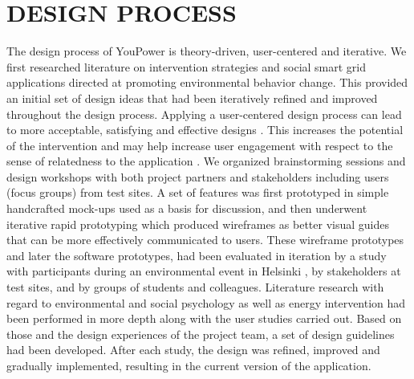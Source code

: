 

\section{\uppercase{Design Process}}

\noindent The design process of YouPower is theory-driven, user-centered and iterative. We first researched literature on intervention strategies and social smart grid applications directed at promoting environmental behavior change. This provided an initial set of design ideas that had been iteratively refined and improved throughout the design process. 
% 
Applying a user-centered design process can lead to more acceptable, satisfying and effective designs \cite{Brynjarsdottir2012}. This increases the potential of the intervention and may help increase user engagement with respect to the sense of relatedness to the application \cite{dick2012empowering,Pierce2012,schwartz2015people, edward2015review}. 
% 
We organized brainstorming sessions and design workshops with both project partners and stakeholders including users (focus groups) from test sites. A set of features was first prototyped in simple handcrafted mock-ups used as a basis for discussion, and then underwent iterative rapid prototyping which produced wireframes as better visual guides that can be more effectively communicated to users. These wireframe prototypes and later the software prototypes, had been evaluated in iteration by a study with participants during an environmental event in Helsinki \cite{Barssi2015}, by stakeholders at test sites, and by groups of students and colleagues. 
% 
Literature research with regard to environmental and social psychology as well as energy intervention had been performed in more depth along with the user studies carried out. Based on those and  the design experiences of the project team, a set of design guidelines had been developed. 
After each study, the design was refined, improved and gradually implemented, resulting in the current version of the application. 


